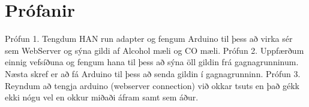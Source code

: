 \section{Prófanir}
Prófun 1. Tengdum HAN run adapter og fengum Arduino til þess að virka sér sem WebServer og sýna gildi af Alcohol mæli og CO mæli. 
Prófun 2. Uppfærðum einnig vefsíðuna og fengum hana til þess að sýna öll gildin frá gagnagrunninum. Næsta skref er að fá Arduino til þess að senda gildin í gagnagrunninn.
Prófun 3. Reyndum að tengja arduino (webserver connection) við okkar tsuts en það gékk ekki nógu vel en okkur miðaði áfram samt sem áður.
   


